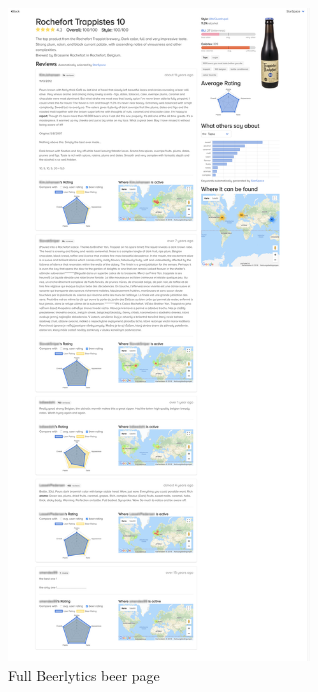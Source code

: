 \begin{figure}[h]
\includegraphics[width=8cm]{assets/beerlytics_beer.png}
\caption{Full Beerlytics beer page}
\centering
\label{fig:beerlytics-beer}
\end{figure}